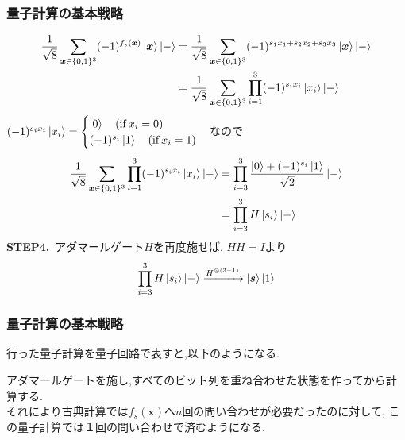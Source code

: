 \documentclass[9pt]{beamer}
\begin{document}
\begin{frame}
    \frametitle{量子計算の基本戦略}
    \begin{align}
        \frac{1}{\sqrt{8}} \sum_{\bm{x} \in \{0,1\}^3} (-1)^{f_s(\bm{x})} \ket{\bm{x}} \ket{-} &=
        \frac{1}{\sqrt{8}} \sum_{\bm{x} \in \{0,1\}^3} (-1)^{s_1x_1 + s_2x_2 + s_3x_3} \ket{\bm{x}} \ket{-} \\
        &= \frac{1}{\sqrt{8}} \sum_{\bm{x} \in \{0,1\}^3} \prod_{i=1}^{3} (-1)^{s_ix_i} \ket{x_i} \ket{-} 
    \end{align}
    $(-1)^{s_ix_i}\ket{x_i} = \begin{cases} \ket{0} \quad (\text{if}\: x_i = 0) \\ (-1)^{s_i}\ket{1} \quad (\text{if} \: x_i = 1) \end{cases}$なので
    \begin{align}
        \frac{1}{\sqrt{8}} \sum_{\bm{x} \in \{0,1\}^3} \prod_{i=1}^{3} (-1)^{s_ix_i} \ket{x_i} \ket{-} &= \prod_{i=3}^{3} \dfrac{\ket{0} + (-1)^{s_i} \ket{1}}{\sqrt{2}} \ket{-} \\
        &= \prod_{i=3}^{3} H\ket{s_i} \ket{-} 
    \end{align}
    \textbf{STEP4.}\, アダマールゲート$H$を再度施せば, $HH = I$より
    \begin{align}
        \prod_{i=3}^{3} H\ket{s_i} \ket{-} \xrightarrow{H^{\otimes(3+1)}} \ket{\bm{s}} \ket{1}
    \end{align}
\end{frame}

\begin{frame}
    \frametitle{量子計算の基本戦略}
    行った量子計算を量子回路で表すと,以下のようになる.
    
    アダマールゲートを施し,すべてのビット列を重ね合わせた状態を作ってから計算する. \\
    それにより古典計算では$f_s(\bm{x})$へ$n$回の問い合わせが必要だったのに対して, この量子計算では１回の問い合わせで済むようになる.
\end{frame}

\end{document}
